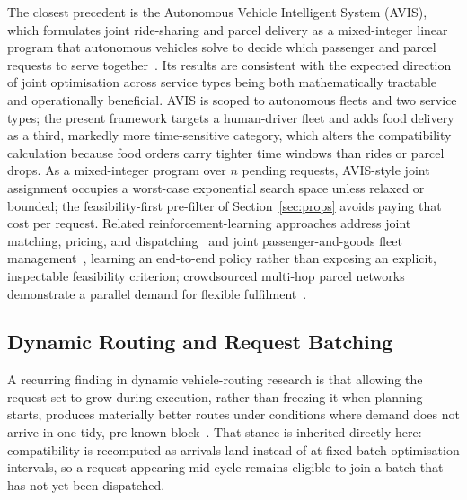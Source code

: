 \documentclass[conference]{IEEEtran}
\begin{document}
The closest precedent is the Autonomous Vehicle Intelligent System (AVIS),
which formulates joint ride-sharing and parcel delivery as a mixed-integer
linear program that autonomous vehicles solve to decide which passenger and
parcel requests to serve together~\cite{zhang2022}. Its results are consistent
with the expected direction of joint optimisation across service types being
both mathematically tractable and operationally beneficial. AVIS is scoped to autonomous fleets and two service types; the present
framework targets a human-driver fleet and adds food delivery as a third,
markedly more time-sensitive category, which alters the compatibility
calculation because food orders carry tighter time windows than rides or
parcel drops. As a mixed-integer program over $n$ pending requests,
AVIS-style joint assignment occupies a worst-case exponential search space
unless relaxed or bounded; the feasibility-first pre-filter of
Section~\ref{sec:props} avoids paying that cost per request. Related reinforcement-learning
approaches address joint matching, pricing, and
dispatching~\cite{haliem2021} and joint passenger-and-goods fleet
management~\cite{manchella2022}, learning an end-to-end policy rather than
exposing an explicit, inspectable feasibility criterion; crowdsourced
multi-hop parcel networks demonstrate a parallel demand for flexible
fulfilment~\cite{hong2019}.

\subsection{Dynamic Routing and Request Batching}
A recurring finding in dynamic vehicle-routing research is that allowing the
request set to grow during execution, rather than freezing it when planning
starts, produces materially better routes under conditions where demand does
not arrive in one tidy, pre-known block~\cite{berahhou}. That stance is
inherited directly here: compatibility is recomputed as arrivals land instead
of at fixed batch-optimisation intervals, so a request appearing mid-cycle
remains eligible to join a batch that has not yet been dispatched.
\end{document}
